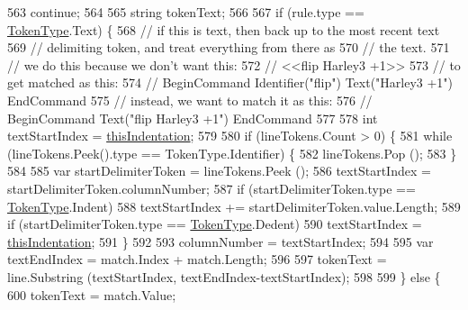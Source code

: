 \begin{DoxyCode}
563                         \textcolor{keywordflow}{continue};
564 
565                     \textcolor{keywordtype}{string} tokenText;
566 
567                     \textcolor{keywordflow}{if} (rule.type == \hyperlink{a00045_a301aa7c866593a5b625a8fc158bbeace}{TokenType}.Text) \{
568                         \textcolor{comment}{// if this is text, then back up to the most recent text}
569                         \textcolor{comment}{// delimiting token, and treat everything from there as}
570                         \textcolor{comment}{// the text.}
571                         \textcolor{comment}{// we do this because we don't want this:}
572                         \textcolor{comment}{//    <<flip Harley3 +1>>}
573                         \textcolor{comment}{// to get matched as this:}
574                         \textcolor{comment}{//    BeginCommand Identifier("flip") Text("Harley3 +1") EndCommand}
575                         \textcolor{comment}{// instead, we want to match it as this:}
576                         \textcolor{comment}{//    BeginCommand Text("flip Harley3 +1") EndCommand}
577 
578                         \textcolor{keywordtype}{int} textStartIndex = \hyperlink{a00336_a0e59365a4aa5811f6495b92a51e23573}{thisIndentation};
579 
580                         \textcolor{keywordflow}{if} (lineTokens.Count > 0) \{
581                             \textcolor{keywordflow}{while} (lineTokens.Peek().type == TokenType.Identifier) \{
582                                 lineTokens.Pop ();
583                             \}
584 
585                             var startDelimiterToken = lineTokens.Peek ();
586                             textStartIndex = startDelimiterToken.columnNumber;
587                             \textcolor{keywordflow}{if} (startDelimiterToken.type == \hyperlink{a00045_a301aa7c866593a5b625a8fc158bbeace}{TokenType}.Indent)
588                                 textStartIndex += startDelimiterToken.value.Length;
589                             \textcolor{keywordflow}{if} (startDelimiterToken.type == \hyperlink{a00045_a301aa7c866593a5b625a8fc158bbeace}{TokenType}.Dedent)
590                                 textStartIndex = \hyperlink{a00336_a0e59365a4aa5811f6495b92a51e23573}{thisIndentation};
591                         \}
592 
593                         columnNumber = textStartIndex;
594 
595                         var textEndIndex = match.Index + match.Length;
596 
597                         tokenText = line.Substring (textStartIndex, textEndIndex-textStartIndex);
598 
599                     \} \textcolor{keywordflow}{else} \{
600                         tokenText = match.Value;

\end{DoxyCode}

